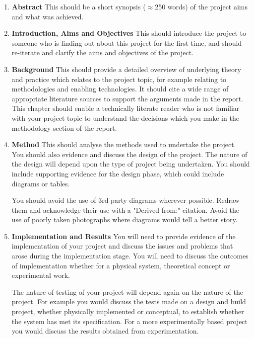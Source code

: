 \begin{enumerate}
    \item \textbf{Abstract}
    \subitem This should be a short synopsis ($\approx$250 words) of the project aims and what was achieved.

    \item \textbf{Introduction, Aims and Objectives}
    \subitem This should introduce the project to someone who is finding out about this project for the first time, and should re-iterate and clarify the aims and objectives of the project.

    \item \textbf{Background}
    \subitem This should provide a detailed overview of underlying theory and practice which relates to the project topic, for example relating to methodologies and enabling technologies. It should cite a wide range of appropriate literature sources to support the arguments made in the report. This chapter should enable a technically literate reader who is not familiar with your project topic to understand the decisions which you make in the methodology section of the report.

    \item \textbf{Method}
    \subitem This should analyse the methods used to undertake the project. You should also evidence and discuss the design of the project. The nature of the design will depend upon the type of project being undertaken. You should include supporting evidence for the design phase, which could include diagrams or tables.

    \begin{tcolorbox}
        You should avoid the use of 3rd party diagrams wherever possible. Redraw them and acknowledge their use with a "Derived from:" citation. Avoid the use of poorly taken photographs where diagrams would tell a better story.
    \end{tcolorbox}

    \item \textbf{Implementation and Results}
    \subitem You will need to provide evidence of the implementation of your project and discuss the issues and problems that arose during the implementation stage. You will need to discuss the outcomes of implementation whether for a physical system, theoretical concept or experimental work.

    The nature of testing of your project will depend again on the nature of the project. For example you would discuss the tests made on a design and build project, whether physically implemented or conceptual, to establish whether the system has met its specification. For a more experimentally based project you would discuss the results obtained from experimentation.


\end{enumerate}
